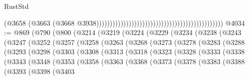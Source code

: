 \begin{lexlean}{RustStd}
\begin{coremodule}
{\begin{coremodule}
{{{{{{{{{{{{{{{{{{{{{{{{{{{{{{{{{{{{{{{{{{{{{{{{{{{{{{{                                                                                            (@3658
                                                                                              (@3663
                                                                                                (@3668
                                                                                                  @3938)))))))))))))))))))))))))))))))))))))))))))))))
@4034 := @869
    (@790
      (@800
        (@3214
          (@3219
            (@3224
              (@3229
                (@3234
                  (@3238
                    (@3243
                      (@3247
                        (@3252
                          (@3257
                            (@3258
                              (@3263
                                (@3268
                                  (@3273
                                    (@3278
                                      (@3283
                                        (@3288
                                          (@3293
                                            (@3298
                                              (@3303
                                                (@3308
                                                  (@3313
                                                    (@3318
                                                      (@3323
                                                        (@3328
                                                          (@3333
                                                            (@3338
                                                              (@3343
                                                                (@3348
                                                                  (@3353
                                                                    (@3358
                                                                      (@3363
                                                                        (@3368
                                                                          (@3373
                                                                            (@3378
                                                                              (@3383
                                                                                (@3388
                                                                                  (@3393
                                                                                    (@3398
                                                                                      (@3403
}}}}}}}}}}}}}}}}}}}}}}}}}}}}}}}}}}}}}}}}}}}}}}}}}}}}}}}
\end{coremodule}}
\end{coremodule}
\end{lexlean}
